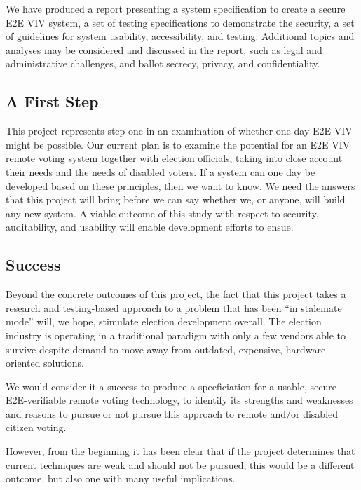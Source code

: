 We have produced a report presenting a system specification to create
a secure E2E VIV system, a set of testing specifications to
demonstrate the security, a set of guidelines for system usability,
accessibility, and testing. Additional topics and analyses may be
considered and discussed in the report, such as legal and
administrative challenges, and ballot secrecy, privacy, and
confidentiality.

\subsection{A First Step}
\label{sec:first-step}

This project represents step one in an examination of whether one day
E2E VIV might be possible. Our current plan is to examine the
potential for an E2E VIV remote voting system together with election
officials, taking into close account their needs and the needs of
disabled voters. If a system can one day be developed based on these
principles, then we want to know. We need the answers that this
project will bring before we can say whether we, or anyone, will build
any new system. A viable outcome of this study with respect to
security, auditability, and usability will enable development efforts
to ensue.

\subsection{Success}
\label{sec:success}

Beyond the concrete outcomes of this project, the fact that this
project takes a research and testing-based approach to a problem that
has been “in stalemate mode” will, we hope, stimulate election
development overall. The election industry is operating in a
traditional paradigm with only a few vendors able to survive despite
demand to move away from outdated, expensive, hardware-oriented
solutions.

We would consider it a success to produce a specficiation for a
usable, secure E2E-verifiable remote voting technology, to identify
its strengths and weaknesses and reasons to pursue or not pursue this
approach to remote and/or disabled citizen voting.

However, from the beginning it has been clear that if the project
determines that current techniques are weak and should not be pursued,
this would be a different outcome, but also one with many useful
implications.

